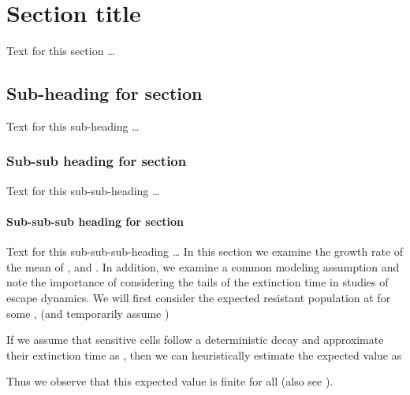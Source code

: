 \documentclass{bmcart}
\begin{document}
\section*{Section title}
Text for this section \ldots
\subsection*{Sub-heading for section}
Text for this sub-heading \ldots
\subsubsection*{Sub-sub heading for section}
Text for this sub-sub-heading \ldots
\paragraph*{Sub-sub-sub heading for section}
Text for this sub-sub-sub-heading \ldots
In this section we examine the growth rate of the mean of ,  and . In
addition, we examine a common modeling assumption and note the
importance of considering the tails of the extinction time  in
studies of escape dynamics.
We will first consider the expected resistant population at  for
some , (and temporarily assume )

If we assume that sensitive cells follow a deterministic decay
 and approximate their extinction time as
, then we can heuristically
estimate the expected value as

Thus we observe that this expected value is finite for all  (also see \cite{koon,khar,zvai,xjon,marg}).
\end{document}
